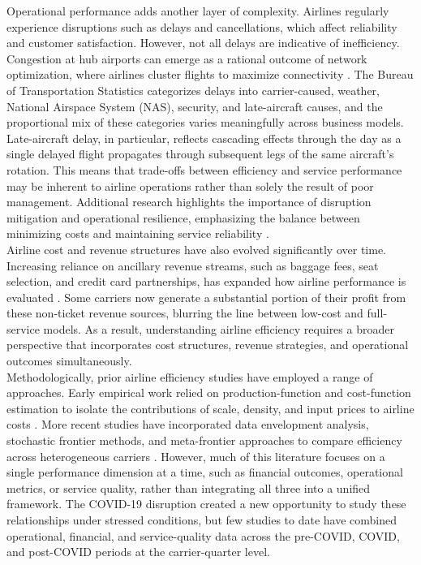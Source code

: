 \documentclass[11pt, letterpaper]{article}
\begin{document}
\indent Operational performance adds another layer of complexity. Airlines regularly experience disruptions such as delays and cancellations, which affect reliability and customer satisfaction. However, not all delays are indicative of inefficiency. Congestion at hub airports can emerge as a rational outcome of network optimization, where airlines cluster flights to maximize connectivity \cite{MayerSinai2002}. The Bureau of Transportation Statistics categorizes delays into carrier-caused, weather, National Airspace System (NAS), security, and late-aircraft causes, and the proportional mix of these categories varies meaningfully across business models. Late-aircraft delay, in particular, reflects cascading effects through the day as a single delayed flight propagates through subsequent legs of the same aircraft's rotation. This means that trade-offs between efficiency and service performance may be inherent to airline operations rather than solely the result of poor management. Additional research highlights the importance of disruption mitigation and operational resilience, emphasizing the balance between minimizing costs and maintaining service reliability \cite{Lee2023}.\\
\indent Airline cost and revenue structures have also evolved significantly over time. Increasing reliance on ancillary revenue streams, such as baggage fees, seat selection, and credit card partnerships, has expanded how airline performance is evaluated \cite{Zhou2020}. Some carriers now generate a substantial portion of their profit from these non-ticket revenue sources, blurring the line between low-cost and full-service models. As a result, understanding airline efficiency requires a broader perspective that incorporates cost structures, revenue strategies, and operational outcomes simultaneously.\\
\indent Methodologically, prior airline efficiency studies have employed a range of approaches. Early empirical work relied on production-function and cost-function estimation to isolate the contributions of scale, density, and input prices to airline costs \cite{Banker1993,Caves1984}. More recent studies have incorporated data envelopment analysis, stochastic frontier methods, and meta-frontier approaches to compare efficiency across heterogeneous carriers \cite{Li2025,Nguyen2022}. However, much of this literature focuses on a single performance dimension at a time, such as financial outcomes, operational metrics, or service quality, rather than integrating all three into a unified framework. The COVID-19 disruption created a new opportunity to study these relationships under stressed conditions, but few studies to date have combined operational, financial, and service-quality data across the pre-COVID, COVID, and post-COVID periods at the carrier-quarter level. \\
\end{document}
